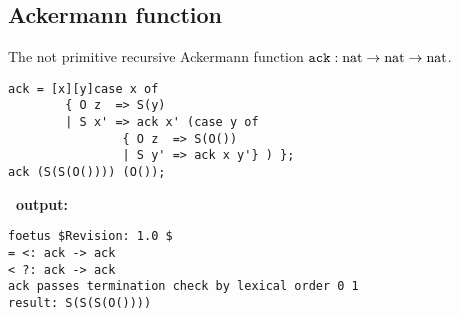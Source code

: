 \subsection{Ackermann function\label{ex:ack}}
The not primitive recursive Ackermann function
$\mathtt{ack} : \mathrm{nat} \rightarrow \mathrm{nat} \rightarrow \mathrm{nat}$.
\begin{verbatim}
ack = [x][y]case x of
        { O z  => S(y)
        | S x' => ack x' (case y of
                { O z  => S(O())
                | S y' => ack x y'} ) };
ack (S(S(O()))) (O());
\end{verbatim}
{\bf\foetus\ output:}\nopagebreak
\begin{verbatim}
foetus $Revision: 1.0 $
= <: ack -> ack
< ?: ack -> ack
ack passes termination check by lexical order 0 1
result: S(S(S(O())))
\end{verbatim}

